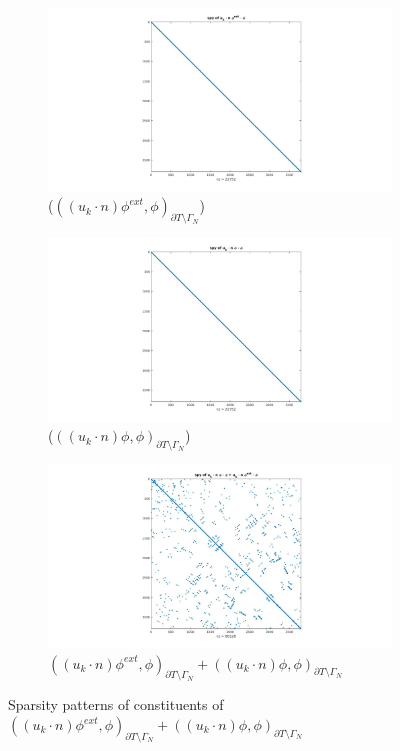 \documentclass[a4paper,12pt]{book}
\begin{document}
\begin{figure}[H]
\begin{subfigure}{.5\textwidth}
\centering
  \includegraphics[width=\linewidth]{figure81.jpg}
  \caption{($((u_k \cdot n)\phi^{ext},\phi)_{\partial T \setminus \Gamma_N}$)}
  \label{figure_81}
\end{subfigure}
\begin{subfigure}{.5\textwidth}	
\centering
  \includegraphics[width=\linewidth]{figure82.jpg}
  \caption{($((u_k \cdot n)\phi,\phi)_{\partial T \setminus \Gamma_N}$)}
  \label{figure_82}
\end{subfigure}
\begin{subfigure}{\textwidth}	
\centering
  \includegraphics[width=\linewidth]{figure8.jpg}
  \caption{$((u_k \cdot n)\phi^{ext},\phi)_{\partial T \setminus \Gamma_N} + ((u_k \cdot n)\phi,\phi)_{\partial T \setminus \Gamma_N}$}
  \label{figure_8}
\end{subfigure}
\caption{Sparsity patterns of constituents of $((u_k \cdot n)\phi^{ext},\phi)_{\partial T \setminus \Gamma_N} + ((u_k \cdot n)\phi,\phi)_{\partial T \setminus \Gamma_N}$}
\label{figure_8_all}
\end{figure}
\end{document}
